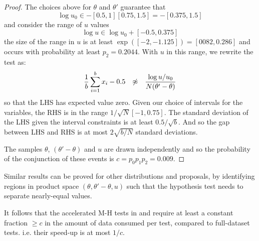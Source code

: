 \documentclass{article}
\begin{document}
\begin{proof}
 The choices above for $\theta$ and $\theta'$ guarantee that
  \begin{equation}
    \log u_0 \in -[0.5,1][0.75,1.5] = -[0.375,1.5]
        \end{equation}
and consider the range of $u$ values
  \begin{equation}
    \log u \in \log u_0 + [-0.5,0.375]
  \end{equation}
  the size of the range in $u$ is at least $\exp([-2,-1.125]) = [0082,0.286]$ and occurs
  with probability at least $p_2=0.2044$. With $u$ in this range, we rewrite the test as:
  \begin{equation}
    \frac{1}{b}\sum_{i=1}^b x_i-0.5 \hspace{0.1in} \not\approx \hspace{0.1in} \frac{\log u/u_0}{N(\theta'-\theta)}
  \end{equation}
  so that the LHS has expected value zero.  Given our choice of intervals for the variables, the RHS is in the range $1/\sqrt{N}[-1,0.75]$.
  The standard deviation of the LHS given the interval constraints is at least $0.5/\sqrt{b}$. And
  so the gap between LHS and RHS is at most $2\sqrt{b/N}$ standard deviations. 


  The samples $\theta$, $(\theta'-\theta)$
  and $u$ are drawn independently and so the probability of the conjunction of these events is
  $c = p_0 p_1 p_2 = 0.009$.
\end{proof}

Similar results can be proved for other distributions and proposals, by identifying
regions in product space $(\theta,\theta'-\theta,u)$ such that the hypothesis test
needs to separate nearly-equal values. 

It follows that the accelerated M-H tests in \cite{icml2014c1_bardenet14} and
\cite{cutting_mh_2014} require at least a constant fraction $\geq c$
in the amount of data consumed per test, compared to full-dataset tests.
i.e. their speed-up is at most $1/c$.
\end{document}
